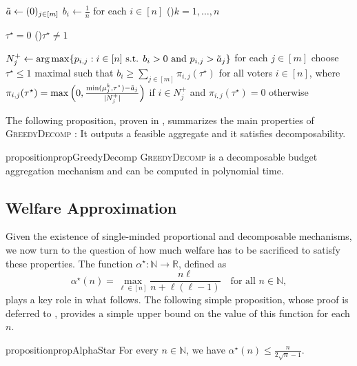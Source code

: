 \documentclass[11pt]{article}
\DeclareMathOperator*{\argmax}{arg\,max}
\newcommand{\N}{\mathbb{N}}
\newcommand{\R}{\mathbb{R}}
\newcommand{\GrdDec}{\textsc{GreedyDecomp} }
\begin{document}
\begin{algorithm}
    \caption{\GrdDec}\label{alg:greedy_decomposable}
    $\Tilde{a} \gets (0)_{j \in [m]}$\;
    $b_i \gets \frac{1}{n}$ for each $i \in [n]$\;
    \For(){$k = 1, \dots, n$}{
      $\tau^\star = 0$\;
      \While(){$\tau^\star \neq 1$}{
        $N_j^+ \gets \argmax \{p_{i,j}: i \in [n] \text{ s.t. } b_{i} > 0 \text{ and } p_{i,j} > \Tilde{a}_j\}$ for each $j \in [m]$\; 
        choose $\tau^\star \le 1$ maximal such that $b_i \ge \sum_{j \in [m]} \pi_{i,j}(\tau^\star)$ for all voters $i \in [n]$, where $\pi_{i,j}(\tau^\star) = \max\Big(0, \frac{\min(\mu^k_j, \tau^\star) - \Tilde{a}_j}{|N_j^+|}\Big)$ if $i \in N_j^+$ and $\pi_{i,j}(\tau^\star) = 0$ otherwise\; %
        
      }
    }
\end{algorithm}


The following proposition, proven in , summarizes the main properties of \GrdDec: It outputs a feasible aggregate and it satisfies decomposability.



\begin{restatable}{proposition}{propGreedyDecomp}
    \GrdDec is a decomposable budget aggregation mechanism and can be computed in polynomial time. \label{prop:greedydecomp_decomposable}
\end{restatable}


\subsection{Welfare Approximation} \label{subsec:welfare_approximation}

Given the existence of single-minded proportional and decomposable mechanisms, we now turn to the question of how much welfare has to be sacrificed to satisfy these properties. 
The function $\alpha^\star\colon \N\to \R$, defined as 
\[
    \alpha^\star(n) = \max_{\ell\in [n]} \frac{n\ell}{n+\ell(\ell-1)}\quad \text{for all } n\in \N,
\]
plays a key role in what follows.
The following simple proposition, whose proof is deferred to , provides a simple %
upper bound on the value of this function for each $n$.
\begin{restatable}{proposition}{propAlphaStar}\label{prop:alpha-star}
    For every $n\in \N$, we have
    \(
        \alpha^\star(n) 
        \leq \frac{n}{2\sqrt{n}-1}.
    \)
\end{restatable}
\end{document}
